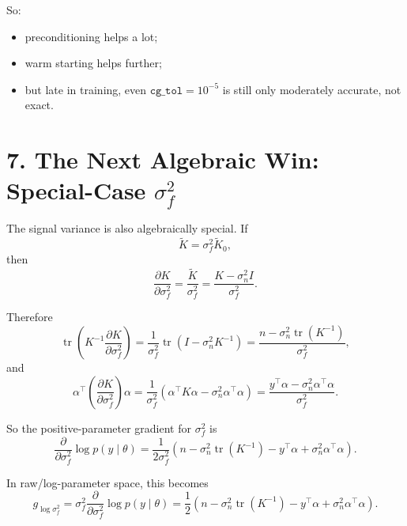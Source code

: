 \documentclass[11pt]{article}
\begin{document}
So:
\begin{itemize}
  \item preconditioning helps a lot;
  \item warm starting helps further;
  \item but late in training, even $\texttt{cg\_tol}=10^{-5}$ is still only
  moderately accurate, not exact.
\end{itemize}

\section*{7. The Next Algebraic Win: Special-Case $\sigma_f^2$}

The signal variance is also algebraically special. If
\begin{equation}
\widetilde K = \sigma_f^2 \widetilde K_0,
\end{equation}
then
\begin{equation}
\frac{\partial K}{\partial \sigma_f^2}
=
\frac{\widetilde K}{\sigma_f^2}
=
\frac{K - \sigma_n^2 I}{\sigma_f^2}.
\end{equation}

Therefore
\begin{equation}
\operatorname{tr}\!\left(K^{-1}\frac{\partial K}{\partial \sigma_f^2}\right)
=
\frac{1}{\sigma_f^2}
\operatorname{tr}\!\left(I - \sigma_n^2 K^{-1}\right)
=
\frac{n - \sigma_n^2 \operatorname{tr}(K^{-1})}{\sigma_f^2},
\end{equation}
and
\begin{equation}
\alpha^\top
\left(\frac{\partial K}{\partial \sigma_f^2}\right)
\alpha
=
\frac{1}{\sigma_f^2}
\left(
\alpha^\top K \alpha
- \sigma_n^2 \alpha^\top \alpha
\right)
=
\frac{y^\top \alpha - \sigma_n^2 \alpha^\top \alpha}{\sigma_f^2}.
\end{equation}

So the positive-parameter gradient for $\sigma_f^2$ is
\begin{equation}
\frac{\partial}{\partial \sigma_f^2}\log p(y \mid \theta)
=
\frac{1}{2\sigma_f^2}
\left(
n - \sigma_n^2 \operatorname{tr}(K^{-1})
- y^\top \alpha
+ \sigma_n^2 \alpha^\top \alpha
\right).
\end{equation}

In raw/log-parameter space, this becomes
\begin{equation}
g_{\log \sigma_f^2}
=
\sigma_f^2 \frac{\partial}{\partial \sigma_f^2}\log p(y \mid \theta)
=
\frac{1}{2}
\left(
n - \sigma_n^2 \operatorname{tr}(K^{-1})
- y^\top \alpha
+ \sigma_n^2 \alpha^\top \alpha
\right).
\end{equation}
\end{document}
